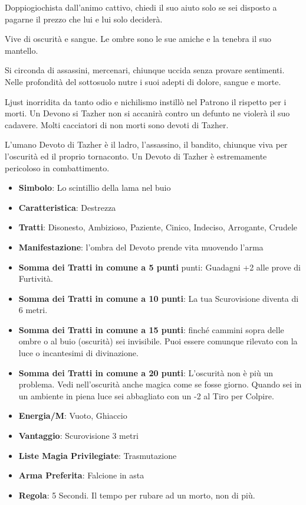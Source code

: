 \begin{multicols}{2}
Doppiogiochista dall'animo cattivo, chiedi il suo aiuto solo se sei disposto a pagarne il prezzo che lui e lui solo deciderà.

Vive di oscurità e sangue. Le ombre sono le sue amiche e la tenebra il suo mantello.

Si circonda di assassini, mercenari, chiunque uccida senza provare sentimenti. Nelle profondità del sottosuolo nutre i suoi adepti di dolore, sangue e morte.

Ljust inorridita da tanto odio e nichilismo instillò nel Patrono il rispetto per i morti. Un Devono si Tazher non si accanirà contro un defunto ne violerà il suo cadavere. Molti cacciatori di non morti sono devoti di Tazher.

L'umano Devoto di Tazher è il ladro, l'assassino, il bandito, chiunque viva per l'oscurità ed il proprio tornaconto. Un Devoto di Tazher è estremamente pericoloso in combattimento.

\begin{itemize}[leftmargin=*] \setlength{\itemsep}{0pt}
\item \textbf{Simbolo}: Lo scintillio della lama nel buio
\item \textbf{Caratteristica}: Destrezza
\item \textbf{Tratti}: Disonesto, Ambizioso, Paziente, Cinico, Indeciso, Arrogante, Crudele
\item \textbf{Manifestazione}: l'ombra del Devoto prende vita muovendo l'arma
\item \textbf{Somma dei Tratti in comune a 5 punti} punti: Guadagni +2 alle prove di Furtività.
\item \textbf{Somma dei Tratti in comune a 10 punti}: La tua Scurovisione diventa di 6 metri.
\item \textbf{Somma dei Tratti in comune a 15 punti}: finché cammini sopra delle ombre o al buio (oscurità) sei invisibile. Puoi essere comunque rilevato con la luce o incantesimi di divinazione.
\item \textbf{Somma dei Tratti in comune a 20 punti}: L'oscurità non è più un problema. Vedi nell'oscurità anche magica come se fosse giorno. Quando sei in un ambiente in piena luce sei abbagliato con un -2 al Tiro per Colpire.
\item \textbf{Energia/M}: Vuoto, Ghiaccio
\item \textbf{Vantaggio}: Scurovisione 3 metri
\item \textbf{Liste Magia Privilegiate}: Trasmutazione
\item \textbf{Arma Preferita}: Falcione in asta
\item \textbf{Regola}: 5 Secondi. Il tempo per rubare ad un morto, non di più.
\end{itemize}


\end{multicols}
